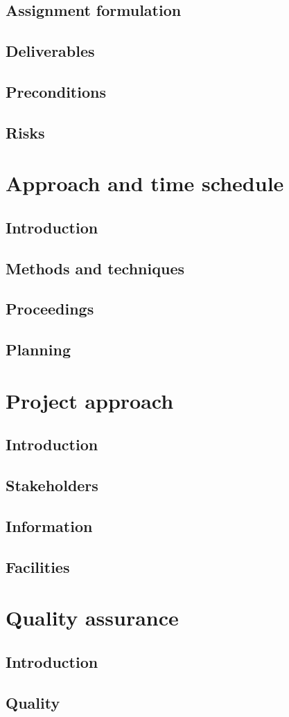 \documentclass[]{article}
\begin{document}
\subsection{Assignment formulation}
\subsection{Deliverables}
\subsection{Preconditions}
\subsection{Risks}
\section{Approach and time schedule}
\subsection{Introduction}
\subsection{Methods and techniques}
\subsection{Proceedings}
\subsection{Planning}
\section{Project approach}
\subsection{Introduction}
\subsection{Stakeholders}
\subsection{Information}
\subsection{Facilities}
\section{Quality assurance}
\subsection{Introduction}
\subsection{Quality}
\end{document}
